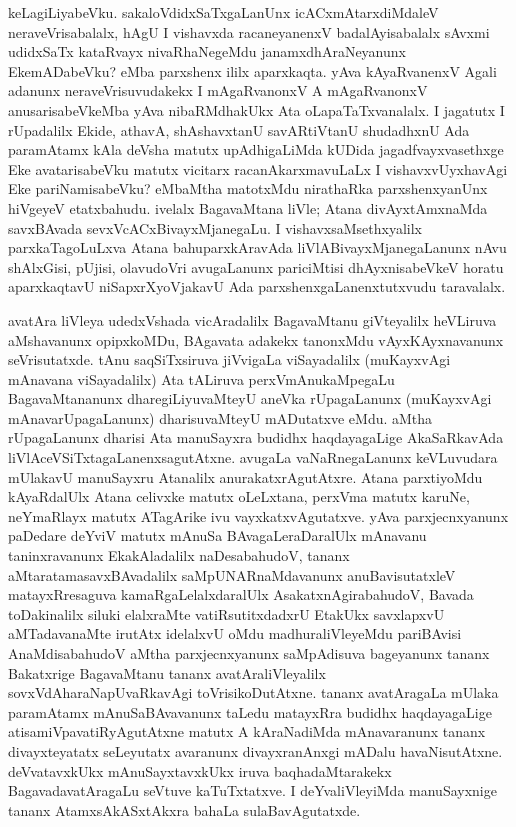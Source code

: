 keLagiLiyabeVku. sakaloVdidxSaTxgaLanUnx icACx\-mAtarxdiMdaleV neraveVrisabalalx, hAgU I vishavxda racaneyanenxV badalAyisabalalx sAvxmi udidxSaTx kataRvayx nivaRhaNegeMdu janamxdhAraNeyanunx EkemADabeVku? eMba parxshenx ililx aparxkaqta. yAva kAyaRvanenxV Agali adanunx neraveVrisuvudakekx I mAgaRvanonxV A mAgaRvanonxV anusarisabeVkeMba yAva nibaRMdhakUkx Ata oLapaTaTxvanalalx. I jagatutx I rUpadalilx Ekide, athavA, shAshavxtanU savARtiVtanU shudadhxnU Ada paramAtamx kAla deVsha matutx upAdhigaLiMda kUDida jagadfvayxvasethxge Eke avatarisabeVku matutx \hbox{vicitarx} racanAkarxmavuLaLx I vishavxvUyxhavAgi Eke pariNamisabeVku? eMbaMtha matotxMdu nira\-thaRka parxshenxyanUnx hiVgeyeV etatxbahudu. ivelalx BagavaMtana liVle; Atana divAyxtAmx\-naMda savxBAvada sevxVcACxBivayxMjanegaLu. I vishavxsaMsethxyalilx parxkaTagoLuLxva Atana bahu\-parxkAravAda liVlABivayxMjanegaLanunx nAvu shAlxGisi, pUjisi, olavudoVri avu\-gaLanunx pariciMtisi dhAyxnisabeVkeV horatu aparxkaqtavU niSapxrXyoVjakavU Ada parxshenxgaLanenxtutxvudu taravalalx.

avatAra liVleya udedxVshada vicAradalilx BagavaMtanu giVteyalilx heVLiruva aMsha\-vanunx opipxkoMDu, BAgavata adakekx tanonxMdu vAyxKAyxnavanunx seVrisutatxde. tAnu saqSiTxsiruva jiVvigaLa viSayadalilx (muKayxvAgi mAnavana viSayadalilx) Ata tALiruva perxVmAnukaMpegaLu BagavaMtananunx dharegiLiyuvaMteyU aneVka rUpagaLanunx (muKayxvAgi mAnavarUpagaLanunx) dharisuvaMteyU mADutatxve eMdu. aMtha rUpagaLanunx dharisi Ata manuSayxra budidhx haqdayagaLige AkaSaRkavAda liVlAceVSiTxtagaLanenxsagutAtxne. avugaLa vaNaRnegaLanunx keVLuvudara mUlakavU manuSayxru Atanalilx anurakatxrAgu\-tAtxre. Atana parxtiyoMdu kAyaRdalUlx Atana celivxke matutx oLeLxtana, perxVma matutx karuNe, neYmaRlayx matutx ATagArike ivu vayxkatxvAgutatxve. yAva parxjecnxyanunx paDedare deYviV matutx mAnuSa BAvagaLeraDaralUlx mAnavanu taninxravanunx EkakAladalilx naDesa\-bahudoV, tananx aMtaratamasavxBAvadalilx saMpUNARnaMdavanunx anuBavisutatxleV matayxRresaguva kamaRgaLelalxdaralUlx AsakatxnAgirabahudoV, Bavada toDakinalilx siluki elalxraMte vatiRsutitxdadxrU EtakUkx savxlapxvU aMTadavanaMte irutAtx idelalxvU oMdu madhura\-liVleyeMdu pariBAvisi AnaMdisabahudoV aMtha parxjecnxyanunx saMpAdisuva bage\-yanunx tananx Bakatxrige BagavaMtanu tananx avatAraliVleyalilx sovxVdAharaNapUvaRkavAgi toVrisikoDutAtxne. tananx avatAragaLa mUlaka paramAtamx mAnuSaBAvavanunx taLedu matayxRra budidhx haqdayagaLige atisamiVpavatiRyAgutAtxne matutx A kAraNadiMda mAnavaranunx tananx divayxteyatatx seLeyutatx avaranunx divayxranAnxgi mADalu havaNisu\-tAtxne. deVvatavxkUkx mAnuSayxtavxkUkx iruva baqhadaMtarakekx BagavadavatAragaLu seVtuve kaTuTxtatxve. I deYvaliVleyiMda manuSayxnige tananx AtamxsAkASxtAkxra bahaLa sulaBavAgutatxde.


